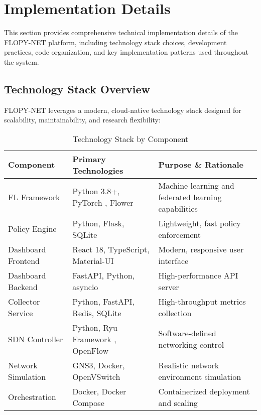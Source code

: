 \section{Implementation Details}
\label{sec:implementation-details}

This section provides comprehensive technical implementation details of the FLOPY-NET platform, including technology stack choices, development practices, code organization, and key implementation patterns used throughout the system.

\subsection{Technology Stack Overview}

FLOPY-NET leverages a modern, cloud-native technology stack designed for scalability, maintainability, and research flexibility:

\begin{table}[H]
\centering
\caption{Technology Stack by Component}
\label{tab:technology-stack}
\begin{tabular}{@{}llp{6cm}@{}}
\toprule
\textbf{Component} & \textbf{Primary Technologies} & \textbf{Purpose \& Rationale} \\
\midrule
FL Framework & Python 3.8+, PyTorch \cite{pytorch}, Flower \cite{beutel2020flower} & Machine learning and federated learning capabilities \\
Policy Engine & Python, Flask, SQLite & Lightweight, fast policy enforcement \\
Dashboard Frontend & React 18, TypeScript, Material-UI & Modern, responsive user interface \\
Dashboard Backend & FastAPI, Python, asyncio & High-performance API server \\
Collector Service & Python, FastAPI, Redis, SQLite & High-throughput metrics collection \\
SDN Controller & Python, Ryu Framework \cite{ryu}, OpenFlow \cite{openflow2012specification} & Software-defined networking control \\
Network Simulation & GNS3, Docker, OpenVSwitch & Realistic network environment simulation \\
Orchestration & Docker, Docker Compose & Containerized deployment and scaling \\
\bottomrule
\end{tabular}
\end{table}

